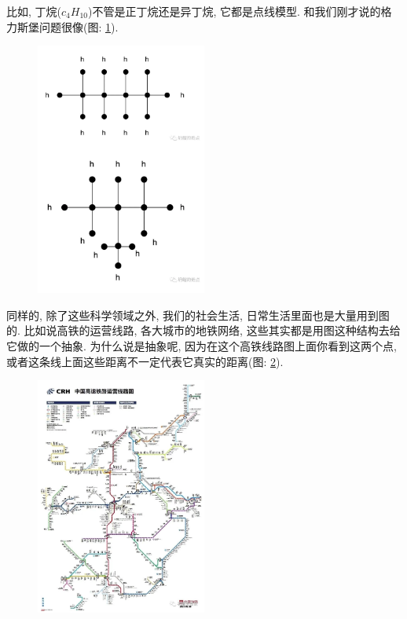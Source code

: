 比如, 丁烷($c_4H_10$)不管是正丁烷还是异丁烷, 它都是点线模型. 和我们刚才说的格力斯堡问题很像(图: \ref{fig:img24_3}). 

\begin{figure}[ht]
  \centering
  \includegraphics[width=0.5\textwidth]{asset/20231227144811.png}
  \caption{}
  \label{fig:img24_3}
\end{figure}

同样的, 除了这些科学领域之外, 我们的社会生活, 日常生活里面也是大量用到图的. 比如说高铁的运营线路, 各大城市的地铁网络, 这些其实都是用图这种结构去给它做的一个抽象. 为什么说是抽象呢, 因为在这个高铁线路图上面你看到这两个点, 或者这条线上面这些距离不一定代表它真实的距离(图: \ref{fig:img24_4}). 

\begin{figure}[ht]
  \centering
  \includegraphics[width=0.5\textwidth]{asset/20231227144832.png}
  \caption{}
  \label{fig:img24_4}
\end{figure}

